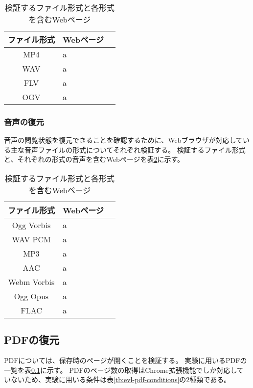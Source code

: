 \begin{table}[htbp]
  \begin{center}
    \caption{検証するファイル形式と各形式を含むWebページ}
    \label{tb:evl-video-check-list}
    \begin{tabular}{|c|l|l|}
      \hline
      ファイル形式 & Webページ \\\hline\hline
      MP4 & a \\\hline
      WAV & a \\\hline
      FLV & a \\\hline
      OGV & a \\\hline
    \end{tabular}
  \end{center}
\end{table}

\subsubsection{音声の復元}
音声の閲覧状態を復元できることを確認するために、Webブラウザが対応している主な音声ファイルの形式についてそれぞれ検証する。
検証するファイル形式と、それぞれの形式の音声を含むWebページを表\ref{tb:evl-audio-check-list}に示す。

\begin{table}[htbp]
  \begin{center}
    \caption{検証するファイル形式と各形式を含むWebページ}
    \label{tb:evl-audio-check-list}
    \begin{tabular}{|c|l|l|}
      \hline
      ファイル形式 & Webページ \\\hline\hline
      Ogg Vorbis & a \\\hline
      WAV PCM & a \\\hline
      MP3 & a \\\hline
      AAC & a \\\hline
      Webm Vorbis & a \\\hline
      Ogg Opus & a \\\hline
      FLAC & a \\\hline
    \end{tabular}
  \end{center}
\end{table}

\subsection{PDFの復元}
PDFについては、保存時のページが開くことを検証する。
実験に用いるPDFの一覧を表\ref{}に示す。
PDFのページ数の取得はChrome拡張機能でしか対応していないため、実験に用いる条件は表\ref{tb:evl-pdf-conditions}の2種類である。

